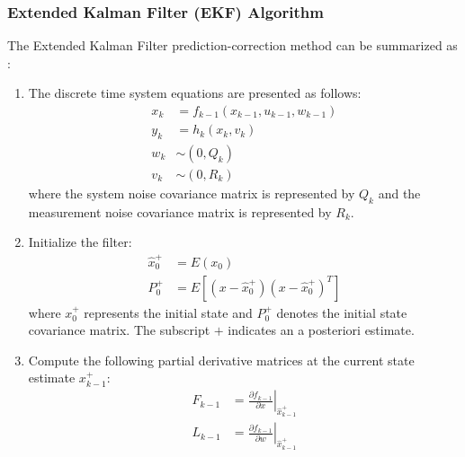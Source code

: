 \subsubsection{Extended Kalman Filter (EKF) Algorithm}

The Extended Kalman Filter prediction-correction method can be summarized as \autocite{Simon_2006}:
\begin{enumerate}
    \item The discrete time system equations are presented as follows:
    \begin{equation}
    \begin{aligned}
        x_{k} & =f_{k-1}\left(x_{k-1}, u_{k-1}, w_{k-1}\right) \\
        y_{k} & =h_{k}\left(x_{k}, v_{k}\right) \\
        w_{k} & \sim\left(0, Q_{k}\right) \\
        v_{k} & \sim\left(0, R_{k}\right)
    \end{aligned}
    \end{equation}  
where the system noise covariance matrix is represented by $Q_k$ and the measurement noise covariance matrix is represented by $R_k$.
    \item Initialize the filter:
    \begin{equation}
        \begin{aligned}
        \hat{x}_{0}^{+} & =E\left(x_{0}\right) \\
        P_{0}^{+} & =E\left[\left(x-\hat{x}_{0}^{+}\right)\left(x-\hat{x}_{0}^{+}\right)^{T}\right]
        \end{aligned}
    \end{equation}
    where ${x}_{0}^{+}$ represents the initial state and $P_{0}^{+}$ denotes the initial state covariance  matrix. The subscript $+$ indicates an a posteriori estimate.
    

    \item Compute the following partial derivative matrices at the current state estimate ${x}_{k-1}^{+}$:
        \begin{equation}
        \begin{aligned}
            F_{k-1} & =\left.\frac{\partial f_{k-1}}{\partial x}\right|_{\hat{x}_{k-1}^{+}} \\
            L_{k-1} & =\left.\frac{\partial f_{k-1}}{\partial w}\right|_{\hat{x}_{k-1}^{+}}
        \end{aligned}
        \end{equation}
    

\end{enumerate}
